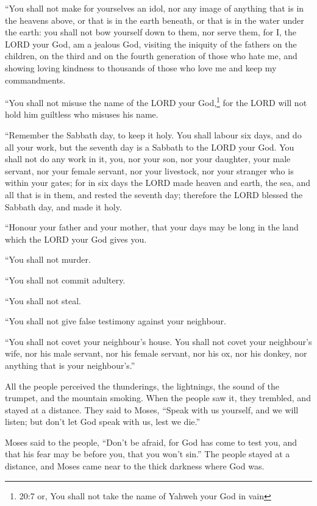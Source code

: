  ``You shall not make for yourselves an idol, nor any image
of anything that is in the heavens above, or that is in the earth
beneath, or that is in the water under the earth:  you shall
not bow yourself down to them, nor serve them, for I, the LORD your God,
am a jealous God, visiting the iniquity of the fathers on the children,
on the third and on the fourth generation of those who hate me,
 and showing loving kindness to thousands of those who love
me and keep my commandments.

 ``You shall not misuse the name of the LORD your
God,\footnote{20:7 or, You shall not take the name of Yahweh your God in
  vain} for the LORD will not hold him guiltless who misuses his name.

 ``Remember the Sabbath day, to keep it holy. 
You shall labour six days, and do all your work,  but the
seventh day is a Sabbath to the LORD your God. You shall not do any work
in it, you, nor your son, nor your daughter, your male servant, nor your
female servant, nor your livestock, nor your stranger who is within your
gates;  for in six days the LORD made heaven and earth, the
sea, and all that is in them, and rested the seventh day; therefore the
LORD blessed the Sabbath day, and made it holy.

 ``Honour your father and your mother, that your days may
be long in the land which the LORD your God gives you.

 ``You shall not murder.

 ``You shall not commit adultery.

 ``You shall not steal.

 ``You shall not give false testimony against your
neighbour.

 ``You shall not covet your neighbour's house. You shall
not covet your neighbour's wife, nor his male servant, nor his female
servant, nor his ox, nor his donkey, nor anything that is your
neighbour's.''

 All the people perceived the thunderings, the lightnings,
the sound of the trumpet, and the mountain smoking. When the people saw
it, they trembled, and stayed at a distance.  They said to
Moses, ``Speak with us yourself, and we will listen; but don't let God
speak with us, lest we die.''

 Moses said to the people, ``Don't be afraid, for God has
come to test you, and that his fear may be before you, that you won't
sin.''  The people stayed at a distance, and Moses came
near to the thick darkness where God was.

